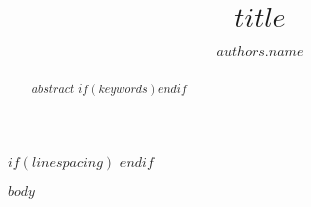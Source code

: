 \documentclass[$for(classoption)$$classoption$$sep$,$endfor$]{wiley-article}
\title{$title$}
\author[$if(authors.affil)$$authors.index$$else$1$endif$$if(authors.presentadd)$\authfn{1}$endif$$if(authors.contrib)$\authfn{2}$endif$]{$authors.name$}
\begin{document}
\maketitle

\begin{abstract}
$abstract$
$if(keywords)$$endif$
\end{abstract}

$if(linespacing)$
$endif$

$body$

\printendnotes




\end{document}
